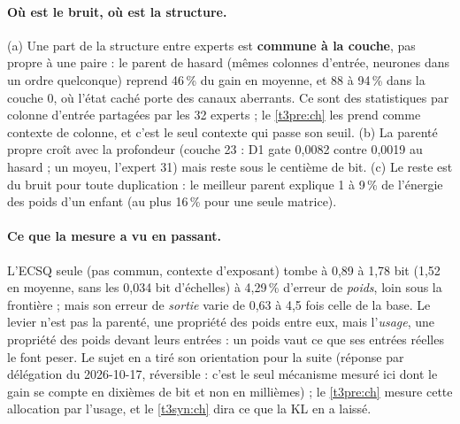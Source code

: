 \paragraph{Où est le bruit, où est la structure.} (a) Une part de la structure entre experts est \textbf{commune à la couche}, pas propre à une paire : le parent de hasard (mêmes colonnes d'entrée, neurones dans un ordre quelconque) reprend 46\,\% du gain en moyenne, et 88 à 94\,\% dans la couche 0, où l'état caché porte des canaux aberrants. Ce sont des statistiques par colonne d'entrée partagées par les 32 experts ; le \cref{t3pre:ch} les prend comme contexte de colonne, et c'est le seul contexte qui passe son seuil. (b) La parenté propre croît avec la profondeur (couche 23 : D1 gate 0,0082 contre 0,0019 au hasard ; un moyeu, l'expert 31) mais reste sous le centième de bit. (c) Le reste est du bruit pour toute duplication : le meilleur parent explique 1 à 9\,\% de l'énergie des poids d'un enfant (au plus 16\,\% pour une seule matrice).

\paragraph{Ce que la mesure a vu en passant.} L'ECSQ seule (pas commun, contexte d'exposant) tombe à 0,89 à 1,78 bit (1,52 en moyenne, sans les 0,034 bit d'échelles) à 4,29\,\% d'erreur de \emph{poids}, loin sous la frontière ; mais son erreur de \emph{sortie} varie de 0,63 à 4,5 fois celle de la base. Le levier n'est pas la parenté, une propriété des poids entre eux, mais l'\emph{usage}, une propriété des poids devant leurs entrées : un poids vaut ce que ses entrées réelles le font peser. Le sujet en a tiré son orientation pour la suite (réponse par délégation du 2026-10-17, réversible : c'est le seul mécanisme mesuré ici dont le gain se compte en dixièmes de bit et non en millièmes) ; le \cref{t3pre:ch} mesure cette allocation par l'usage, et le \cref{t3syn:ch} dira ce que la KL en a laissé.

